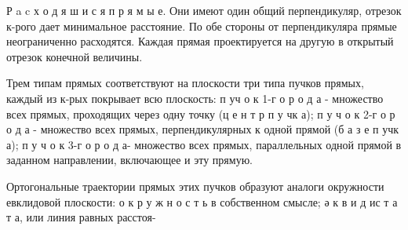 \documentclass[10pt]{article}
\begin{document}
Р a c х о д я ш и с я п р я м ы е. Они имеют один общий перпендикуляр, отрезок к-рого дает минимальное расстояние. По обе стороны от перпендикуляра прямые неограниченно расходятся. Каждая прямая проектируется на другую в открытый отрезок конечной величины.



Трем типам прямых соответствуют на плоскости три типа пучков прямых, каждый из к-рых покрывает всю плоскость: п уч о к 1-г о р о д а - множество всех прямых, проходящих через одну точку (ц е н т р п у чк а); п у ч о к 2-г о р о д а - множество всех прямых, перпендикулярных к одной прямой (б а з е п учк а); п у ч о к 3-г о р о д а- множество всех прямых, параллельных одной прямой в заданном направлении, включающее и эту прямую.



Ортогональные траектории прямых этих пучков образуют аналоги окружности евклидовой плоскости: о к р у ж н о с т ь в собственном смысле; ә к в и д ис т а т а, или линия равных расстоя-
\end{document}
